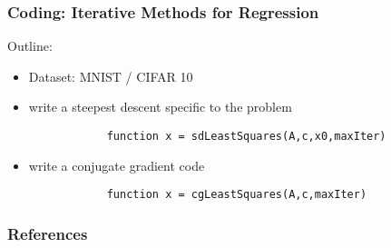 \documentclass[12pt,fleqn]{beamer}
\begin{document}
\begin{frame}[fragile]
	\frametitle{Coding: Iterative Methods for Regression}
	
	Outline:
	\begin{itemize}
		\item Dataset: MNIST / CIFAR 10
		\item write a steepest descent specific to the problem
		\begin{verbatim}
			function x = sdLeastSquares(A,c,x0,maxIter)
		\end{verbatim}
		\item write a conjugate gradient code
		\begin{verbatim}
			function x = cgLeastSquares(A,c,maxIter)
		\end{verbatim}
	\end{itemize}
\end{frame}



\begin{frame}[allowframebreaks]
	\frametitle{References}



\end{frame}
\end{document}

